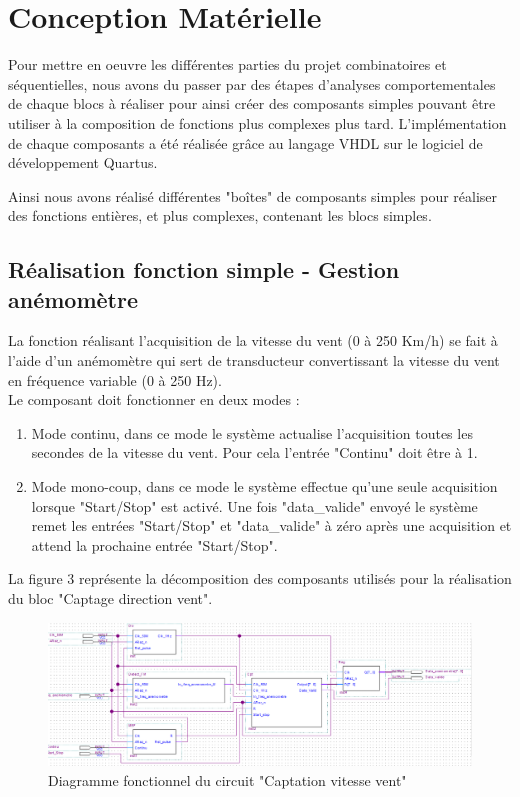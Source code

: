 \section{Conception Matérielle}
Pour mettre en oeuvre les différentes parties du projet combinatoires et séquentielles, nous avons du passer par des étapes d'analyses comportementales de chaque blocs à réaliser pour ainsi créer des composants simples pouvant être utiliser à la composition de fonctions plus complexes plus tard. L'implémentation de chaque composants a été réalisée grâce au langage VHDL sur le logiciel de développement Quartus.

Ainsi nous avons réalisé différentes "boîtes" de composants simples pour réaliser des fonctions entières, et plus complexes, contenant les blocs simples.

\subsection{Réalisation fonction simple - Gestion anémomètre}
La fonction réalisant l'acquisition de la vitesse du vent (0 à 250 Km/h) se fait à l'aide d'un anémomètre qui sert de transducteur convertissant la vitesse du vent en fréquence variable (0 à 250 Hz). 
\vspace{0.5cm}\\
Le composant doit fonctionner en deux modes :
\begin{enumerate}
    \item Mode continu, dans ce mode le système actualise l'acquisition toutes les secondes de la vitesse du vent. Pour cela l'entrée "Continu" doit être à 1. 
    \item Mode mono-coup, dans ce mode le système effectue qu'une seule acquisition lorsque "Start/Stop" est activé. Une fois "data\_valide" envoyé le système remet les entrées "Start/Stop" et "data\_valide" à zéro après une acquisition et attend la prochaine entrée "Start/Stop".
\end{enumerate}
\vspace{0.5cm}
La figure 3 représente la décomposition des composants utilisés pour la réalisation du bloc "Captage direction vent". 

\begin{figure}[h]
    \begin{center}
      \includegraphics[width=\textwidth]{images/captation.png}
      \caption{Diagramme fonctionnel du circuit "Captation vitesse vent"}
    \end{center}
  \end{figure}

